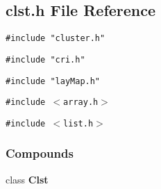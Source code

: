 \subsection{clst.h File Reference}
\label{clst.h}
{\tt \#include "cluster.h"}\par
{\tt \#include "cri.h"}\par
{\tt \#include "lay\-Map.h"}\par
{\tt \#include $<$array.h$>$}\par
{\tt \#include $<$list.h$>$}\par
\subsubsection*{Compounds}
\begin{CompactItemize}
\item 
class {\bf Clst}
\end{CompactItemize}
